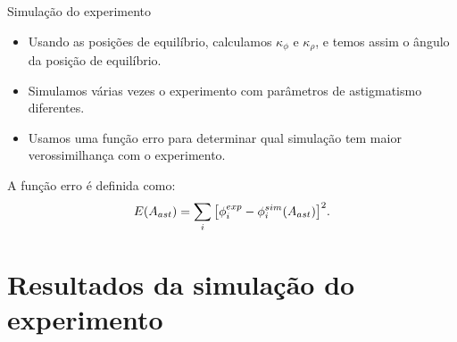 \documentclass[10pt]{beamer}
\begin{document}

\begin{frame}[fragile]{Simulação do experimento} %

    \begin{center}
        \begin{itemize}

        \item Usando as posições de equilíbrio, calculamos $\kappa_\phi$ e $\kappa_\rho$, e temos assim o ângulo da posição de equilíbrio.

        \item Simulamos várias vezes o experimento com parâmetros de astigmatismo diferentes.

        \item Usamos uma função erro para determinar qual simulação tem maior verossimilhança com o experimento. 

        \end{itemize}
        A função erro é definida como:
        \begin{equation}
        E(A_{ast})=\sum \limits_i \big{[} \phi_i^{exp} - \phi_i^{sim}(A_{ast}) \big{]}^2.
        \end{equation}

    \end{center}

\end{frame}

\section{Resultados da simulação do experimento}
\end{document}
